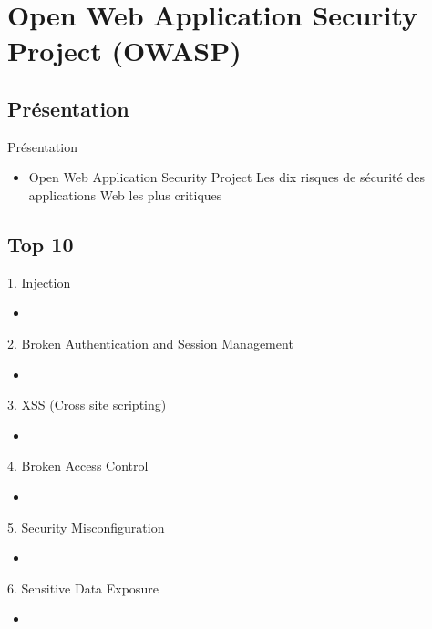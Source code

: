\documentclass{beamer}
\begin{document}
\section{Open Web Application Security Project (OWASP)}
	\subsection{Présentation}
	\begin{frame}{Présentation}
		\begin{itemize}
			\item Open Web Application Security Project
			\itemp Les dix risques de sécurité des applications Web les plus critiques		
		\end{itemize}
	\end{frame}
	
	\subsection{Top 10}
	\begin{frame}{1. Injection}
		\begin{itemize}
			\item %
		\end{itemize}
	\end{frame}
	\begin{frame}{2. Broken Authentication and Session Management}
		\begin{itemize}
			\item %
		\end{itemize}
	\end{frame}
	\begin{frame}{3. XSS (Cross site scripting)}
		\begin{itemize}
			\item %
		\end{itemize}
	\end{frame}
	\begin{frame}{4. Broken Access Control}
		\begin{itemize}
			\item %
		\end{itemize}
	\end{frame}
	\begin{frame}{5. Security Misconfiguration}
		\begin{itemize}
		\item %
		\end{itemize}
	\end{frame}
	\begin{frame}{6. Sensitive Data Exposure}
		\begin{itemize}
			\item %
		\end{itemize}
	\end{frame}
\end{document}
